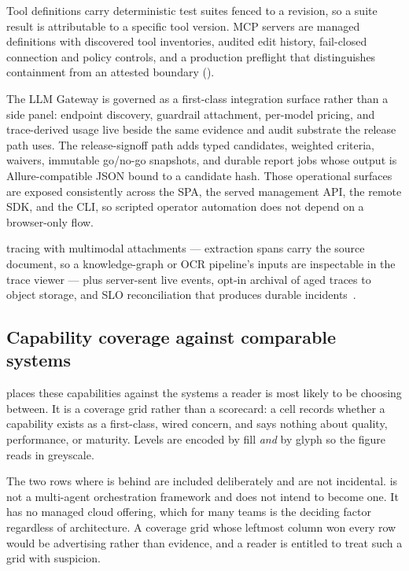  Tool definitions carry deterministic test suites
fenced to a revision, so a suite result is attributable to a specific tool version.
MCP servers are managed definitions with discovered tool inventories, audited edit
history, fail-closed connection and policy controls, and a production preflight
that distinguishes containment from an attested boundary
().

 The LLM Gateway is governed as a
first-class integration surface rather than a side panel: endpoint discovery,
guardrail attachment, per-model pricing, and trace-derived usage live beside the
same evidence and audit substrate the release path uses. The release-signoff path
adds typed candidates, weighted criteria, waivers, immutable go/no-go snapshots,
and durable report jobs whose output is Allure-compatible JSON bound to a
candidate hash. Those operational surfaces are exposed consistently across the SPA,
the served management API, the remote SDK, and the CLI, so scripted operator
automation does not depend on a browser-only flow.

 \mlflow{} tracing with multimodal attachments --- extraction
spans carry the source document, so a knowledge-graph or OCR pipeline's inputs are
inspectable in the trace viewer --- plus server-sent live events, opt-in archival of
aged traces to object storage, and SLO reconciliation that produces durable
incidents~\cite{beyer2016sre}.

\subsection{Capability coverage against comparable systems}



 places these capabilities against the systems a reader is
most likely to be choosing between. It is a coverage grid rather than a scorecard: a
cell records whether a capability exists as a first-class, wired concern, and says
nothing about quality, performance, or maturity. Levels are encoded by fill
\emph{and} by glyph so the figure reads in greyscale.

The two rows where \sys is behind are included deliberately and are not
incidental. \sys is not a multi-agent orchestration framework and does not intend
to become one. It has no managed cloud offering, which for many teams is the
deciding factor regardless of architecture. A coverage grid whose leftmost column
won every row would be advertising rather than evidence, and a reader is entitled to
treat such a grid with suspicion.
